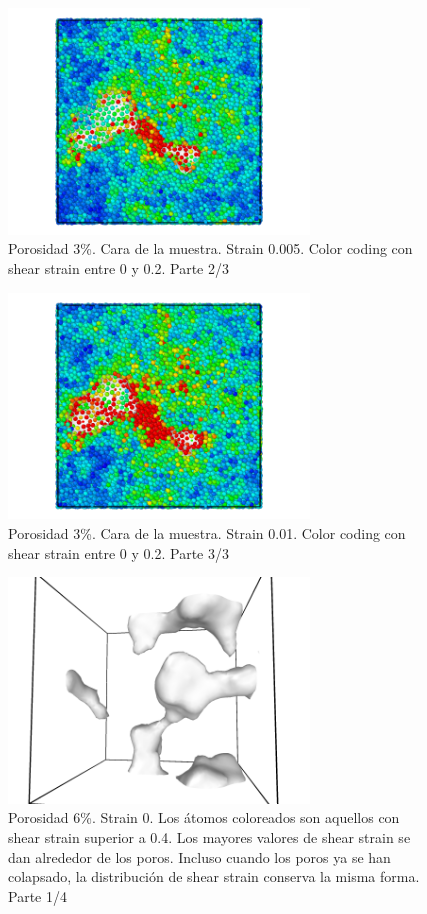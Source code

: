 \documentclass[10pt, oneside]{article} %
\begin{document}
\begin{figure}[H]
\centering
\includegraphics[width=8cm]{Figures/porosidad_3_faceAS_0_02_0005.png}
\caption{Porosidad 3\%. Cara de la muestra. Strain 0.005. Color coding con shear strain entre 0 y 0.2. Parte 2/3}
\end{figure}

\begin{figure}[H]
\centering
\includegraphics[width=8cm]{Figures/porosidad_3_faceAS_0_02_001.png}
\caption{Porosidad 3\%. Cara de la muestra. Strain 0.01. Color coding con shear strain entre 0 y 0.2. Parte 3/3}
\end{figure}

\begin{figure}[H]
\centering
\includegraphics[width=8cm]{Figures/porosidad_6_shearstrain04_0.png}
\caption{Porosidad 6\%. Strain 0. Los átomos coloreados son aquellos con shear strain superior a 0.4. Los mayores valores de shear strain se dan alrededor de los poros. Incluso cuando los poros ya se han colapsado, la distribución de shear strain conserva la misma forma. Parte 1/4}
\end{figure}
\end{document}
